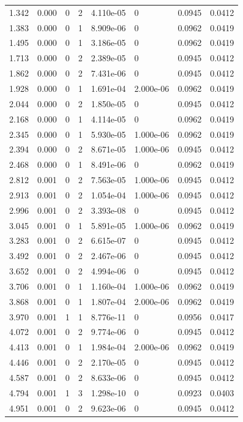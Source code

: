 \documentclass[preview]{standalone}
\begin{document}
{{\begin{tabular}{L{1.2cm}C{1.2cm} C{0.3cm}C{0.5cm} C{1.4cm}C{1.4cm} C{1.4cm}C{1.4cm}}
  1.342  &  0.000  & 0     &  2 &  4.110e-05  & 0  & 0.0945 &  0.0412   \\ 
  1.383  &  0.000  & 0     &  1 &  8.909e-06  & 0  & 0.0962 &  0.0419   \\ 
  1.495  &  0.000  & 0     &  1 &  3.186e-05  & 0  & 0.0962 &  0.0419   \\ 
  1.713  &  0.000  & 0     &  2 &  2.389e-05  & 0  & 0.0945 &  0.0412   \\ 
  1.862  &  0.000  & 0     &  2 &  7.431e-06  & 0  & 0.0945 &  0.0412   \\ 
  1.928  &  0.000  & 0     &  1 &  1.691e-04  & 2.000e-06  & 0.0962 &  0.0419   \\ 
  2.044  &  0.000  & 0     &  2 &  1.850e-05  & 0  & 0.0945 &  0.0412   \\ 
  2.168  &  0.000  & 0     &  1 &  4.114e-05  & 0  & 0.0962 &  0.0419   \\ 
  2.345  &  0.000  & 0     &  1 &  5.930e-05  & 1.000e-06  & 0.0962 &  0.0419   \\ 
  2.394  &  0.000  & 0     &  2 &  8.671e-05  & 1.000e-06  & 0.0945 &  0.0412   \\ 
  2.468  &  0.000  & 0     &  1 &  8.491e-06  & 0  & 0.0962 &  0.0419   \\ 
  2.812  &  0.001  & 0     &  2 &  7.563e-05  & 1.000e-06  & 0.0945 &  0.0412   \\ 
  2.913  &  0.001  & 0     &  2 &  1.054e-04  & 1.000e-06  & 0.0945 &  0.0412   \\ 
  2.996  &  0.001  & 0     &  2 &  3.393e-08  & 0  & 0.0945 &  0.0412   \\ 
  3.045  &  0.001  & 0     &  1 &  5.891e-05  & 1.000e-06  & 0.0962 &  0.0419   \\ 
  3.283  &  0.001  & 0     &  2 &  6.615e-07  & 0  & 0.0945 &  0.0412   \\ 
  3.492  &  0.001  & 0     &  2 &  2.467e-06  & 0  & 0.0945 &  0.0412   \\ 
  3.652  &  0.001  & 0     &  2 &  4.994e-06  & 0  & 0.0945 &  0.0412   \\ 
  3.706  &  0.001  & 0     &  1 &  1.160e-04  & 1.000e-06  & 0.0962 &  0.0419   \\ 
  3.868  &  0.001  & 0     &  1 &  1.807e-04  & 2.000e-06  & 0.0962 &  0.0419   \\ 
  3.970  &  0.001  & 1     &  1 &  8.776e-11  & 0  & 0.0956 &  0.0417   \\ 
  4.072  &  0.001  & 0     &  2 &  9.774e-06  & 0  & 0.0945 &  0.0412   \\ 
  4.413  &  0.001  & 0     &  1 &  1.984e-04  & 2.000e-06  & 0.0962 &  0.0419   \\ 
  4.446  &  0.001  & 0     &  2 &  2.170e-05  & 0  & 0.0945 &  0.0412   \\ 
  4.587  &  0.001  & 0     &  2 &  8.633e-06  & 0  & 0.0945 &  0.0412   \\ 
  4.794  &  0.001  & 1     &  3 &  1.298e-10  & 0  & 0.0923 &  0.0403   \\ 
  4.951  &  0.001  & 0     &  2 &  9.623e-06  & 0  & 0.0945 &  0.0412   \\ 
\hline 
\end{tabular} 

}}
\end{document}

